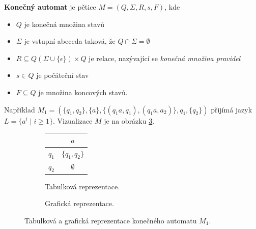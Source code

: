 \begin{definition}
    \textbf{Konečný automat} je pětice $M=(Q, \Sigma ,R,s,F)$, kde
    \begin{itemize}
        \item $Q$ je konečná množina stavů
        \item $\Sigma$ je vstupní abeceda taková, že $Q \cap \Sigma = \emptyset $
        \item $R \subseteq Q(\Sigma \cup \{ \epsilon \} ) \times Q$ je relace, nazývající se \textit{konečná množina pravidel}
        \item $s \in Q$ je počáteční stav
        \item $F \subseteq Q$ je množina koncových stavů.
    \end{itemize}
\end{definition}

\begin{example}
    Například $M_1 = ( \{ q_1,q_2 \} , \{ a \} , \{ (q_1a,q_1),(q_1a,a_2)  \} , q_1, \{ q_2 \} )$ přijímá jazyk $L= \{ a^i \mid i \ge 1 \} $. Vizualizace $M$ je na obrázku \ref{ex_fa_viz}.
\end{example}

\begin{figure}[t]
    \centering
    \begin{subfigure}{.5\textwidth}
        \centering
        \begin{tabular}{ |c|c| } 
            \hline
            & $ a $ \\ 
            \hline
            $q_1$ & $ \{ q_1,q_2 \} $ \\ 
            \hline
            $q_2$ & $ \emptyset $ \\ 
            \hline
        \end{tabular}
        \caption{Tabulková reprezentace.}
        \label{ex_fa_table}
    \end{subfigure}%
    \begin{subfigure}{.5\textwidth}
        \centering
        \caption{Grafická reprezentace.}
        \label{ex_fa_graph}
    \end{subfigure}
    \caption{Tabulková a grafická reprezentace konečného automatu $M_1$.}
        \label{ex_fa_viz}
\end{figure}

